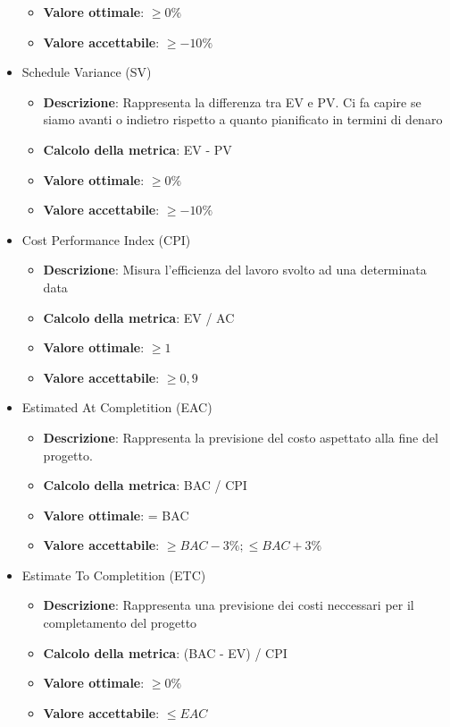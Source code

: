 \documentclass[12pt]{article}
\begin{document}
\begin{itemize}
\begin{itemize}
		      \item \textbf{Valore ottimale}: $\ge 0\%$
		      \item \textbf{Valore accettabile}: $\ge -10\%$
	      \end{itemize}
	\item Schedule Variance (SV)
	      \begin{itemize}
		      \item \textbf{Descrizione}: Rappresenta la differenza tra EV e PV. Ci fa capire se siamo avanti o indietro rispetto a quanto pianificato in termini di denaro
		      \item \textbf{Calcolo della metrica}:  EV - PV
		      \item \textbf{Valore ottimale}: $\ge 0\%$
		      \item \textbf{Valore accettabile}: $\ge -10\%$
	      \end{itemize}

	\item Cost Performance Index (CPI)
			\begin{itemize}
				\item \textbf{Descrizione}: Misura l'efficienza del lavoro svolto ad una determinata data
				\item \textbf{Calcolo della metrica}:  EV / AC
				\item \textbf{Valore ottimale}: $\ge 1$
				\item \textbf{Valore accettabile}: $\ge 0,9$
			\end{itemize}
	
	\item Estimated At Completition (EAC)
	      \begin{itemize}
		      \item \textbf{Descrizione}: Rappresenta la previsione del costo aspettato alla fine del progetto.
		      \item \textbf{Calcolo della metrica}:  BAC / CPI
		      \item \textbf{Valore ottimale}: = BAC
		      \item \textbf{Valore accettabile}: $\ge BAC - 3\% ; \le BAC + 3\% $
	      \end{itemize}
	\item Estimate To Completition (ETC)
	      \begin{itemize}
		      \item \textbf{Descrizione}: Rappresenta una previsione dei costi neccessari per il completamento del progetto
		      \item \textbf{Calcolo della metrica}:  (BAC - EV) / CPI
		      \item \textbf{Valore ottimale}: $\ge 0\%$
		      \item \textbf{Valore accettabile}: $\le EAC$
	      \end{itemize}
	
\end{itemize}
\end{document}
